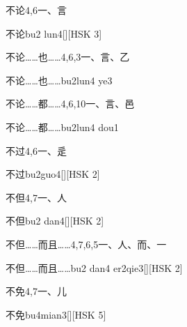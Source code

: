 \begin{entry}{不论}{4,6}{⼀、⾔}
  \begin{phonetics}{不论}{bu2 lun4}[][HSK 3]
  \end{phonetics}
\end{entry}

\begin{entry}{不论……也……}{4,6,3}{⼀、⾔、⼄}
  \begin{phonetics}{不论……也……}{bu2lun4 ye3}
  \end{phonetics}
\end{entry}

\begin{entry}{不论……都……}{4,6,10}{⼀、⾔、⾢}
  \begin{phonetics}{不论……都……}{bu2lun4 dou1}
  \end{phonetics}
\end{entry}

\begin{entry}{不过}{4,6}{⼀、⾡}
  \begin{phonetics}{不过}{bu2guo4}[][HSK 2]
  \end{phonetics}
\end{entry}

\begin{entry}{不但}{4,7}{⼀、⼈}
  \begin{phonetics}{不但}{bu2 dan4}[][HSK 2]
  \end{phonetics}
\end{entry}

\begin{entry}{不但……而且……}{4,7,6,5}{⼀、⼈、⽽、⼀}
  \begin{phonetics}{不但……而且……}{bu2 dan4 er2qie3}[][HSK 2]
  \end{phonetics}
\end{entry}

\begin{entry}{不免}{4,7}{⼀、⼉}
  \begin{phonetics}{不免}{bu4mian3}[][HSK 5]
  \end{phonetics}
\end{entry}


